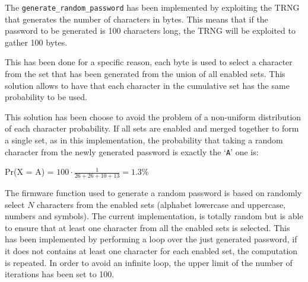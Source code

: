 The \texttt{generate\_random\_password} has been implemented by exploiting the TRNG that generates the number of characters in bytes. This means that if the password to be generated is 100 characters long, the TRNG will be exploited to gather 100 bytes. 

This has been done for a specific reason, each byte is used to select a character from the set that has been generated from the union of all enabled sets.\newline\newline
This solution allows to have that each character in the cumulative set has the same probability to be used.

This solution has been choose to avoid the problem of a non-uniform distribution of each character probability. If all sets are enabled and merged together to form a single set, as in this implementation, the probability that taking a random character from the newly generated password is exactly the `\texttt{A}' one is:
\begin{center}
	Pr(X = A) = $100 \cdot \frac{1}{26+26+10+13} = 1.3 \%$
\end{center}

The firmware function used to generate a random password is based on randomly select $N$ characters from the enabled sets (alphabet lowercase and uppercase, numbers and symbols). The current implementation, is totally random but is able to ensure that at least one character from all the enabled sets is selected. This has been implemented by performing a loop over the just generated password, if it does not contains at least one character for each enabled set, the computation is repeated. In order to avoid an infinite loop, the upper limit of the number of iterations has been set to 100.


